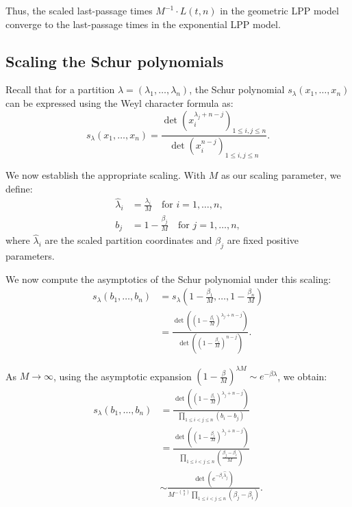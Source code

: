 \documentclass[letterpaper,11pt,oneside,reqno]{book}
\numberwithin{equation}{chapter}  %
\theoremstyle{definition}
\begin{document}
Thus, the scaled last-passage times $M^{-1}\cdot L(t,n)$
in the geometric LPP model converge to the last-passage times
in the exponential LPP model.

\subsection{Scaling the Schur polynomials}

Recall that for a partition $\lambda = (\lambda_1, \ldots, \lambda_n)$, the Schur polynomial $s_\lambda(x_1, \ldots, x_n)$ can be expressed using the Weyl character formula as:
\begin{equation}
    s_\lambda(x_1, \ldots, x_n) = \frac{\det(x_i^{\lambda_j+n-j})_{1 \leq i,j \leq n}}{\det(x_i^{n-j})_{1 \leq i,j \leq n}}.
\end{equation}

We now establish the appropriate scaling. With $M$ as our scaling parameter, we define:
\begin{align}
    \hat{\lambda}_i &= \frac{\lambda_i}{M} \quad \text{for } i=1,\ldots,n,\\
    b_j &= 1 - \frac{\beta_j}{M} \quad \text{for } j=1,\ldots,n,
\end{align}
where $\hat{\lambda}_i$ are the scaled partition coordinates and $\beta_j$ are fixed positive parameters.

We now compute the asymptotics of the Schur polynomial under this scaling:
\begin{align}
    s_\lambda(b_1, \ldots, b_n) &= s_\lambda\left(1-\frac{\beta_1}{M}, \ldots, 1-\frac{\beta_n}{M}\right)\\
		&= \frac{\det\left(\left(1-\frac{\beta_i}{M}\right)^{\lambda_j+n-j}\right)}{\det\left(\left(1-\frac{\beta_i}{M}\right)^{n-j}\right)}.
\end{align}

As $M \to \infty$, using the asymptotic expansion $\left(1-\frac{\beta}{M}\right)^{\lambda M} \sim e^{-\beta \lambda}$, we obtain:
\begin{align}
    s_\lambda(b_1, \ldots, b_n) &= \frac{\det\left(\left(1-\frac{\beta_i}{M}\right)^{\lambda_j+n-j}\right)}{\prod_{1 \leq i < j \leq n}\left(b_i-b_j\right)}\\
    &= \frac{\det\left(\left(1-\frac{\beta_i}{M}\right)^{\lambda_j+n-j}\right)}{\prod_{1 \leq i < j \leq n}\left(\frac{\beta_j-\beta_i}{M}\right)}\\
		&\sim \frac{\det\left(e^{-\beta_i\hat{\lambda}_j } \right)}{M^{-\binom{n}{2}}\prod_{1 \leq i < j \leq n}(\beta_j-\beta_i)}.
\end{align}
\end{document}
